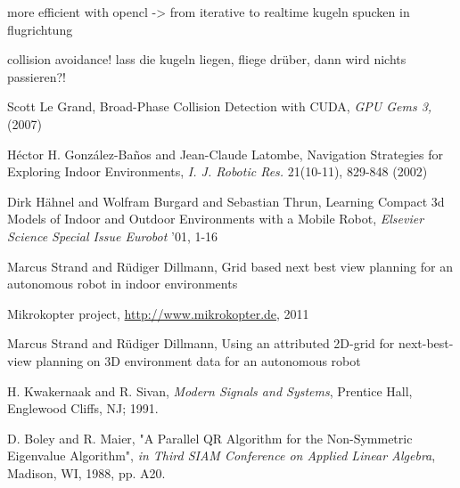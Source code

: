 \documentclass[a4paper, 10pt, conference]{ieeeconf}        %
\begin{document}
more efficient with opencl -> from iterative to realtime
kugeln spucken in flugrichtung

collision avoidance! lass die kugeln liegen, fliege drüber, dann wird nichts passieren?!


\begin{thebibliography}{99}




Scott Le Grand, Broad-Phase Collision Detection with CUDA, {\it GPU Gems 3, } (2007)

H\'{e}ctor H. Gonz\'{a}lez-Ba\~{n}os and Jean-Claude Latombe, Navigation Strategies for Exploring Indoor Environments, {\it I. J. Robotic Res.} 21(10-11), 829-848 (2002)

Dirk H\"ahnel and Wolfram Burgard and Sebastian Thrun, Learning Compact 3d Models of Indoor and Outdoor Environments with a Mobile Robot, {\it Elsevier Science Special Issue Eurobot} '01, 1-16

Marcus Strand and Rüdiger Dillmann, Grid based next best view planning for an autonomous robot in indoor environments

Mikrokopter project, \url{http://www.mikrokopter.de}, 2011

Marcus Strand and Rüdiger Dillmann, Using an attributed 2D-grid for next-best-view planning on 3D environment data for an autonomous robot

H. Kwakernaak and R. Sivan, {\it Modern Signals and Systems}, Prentice Hall, Englewood Cliffs, NJ; 1991.

D. Boley and R. Maier, "A Parallel QR Algorithm for the Non-Symmetric Eigenvalue Algorithm", {\it in Third SIAM Conference on Applied Linear Algebra}, Madison, WI, 1988, pp. A20.

\end{thebibliography}
\end{document}
